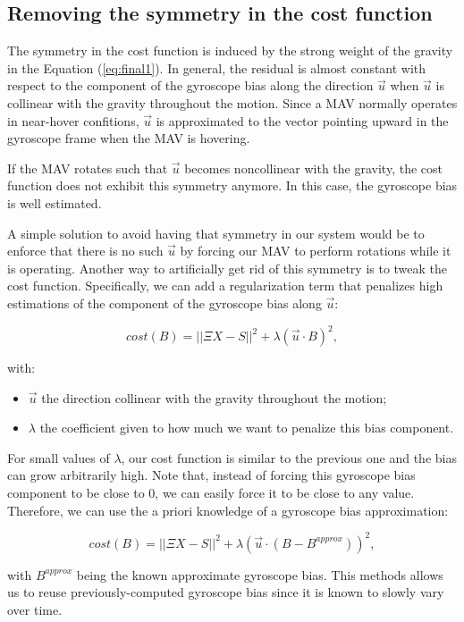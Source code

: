\documentclass[letterpaper, 10 pt, conference]{ieeeconf}  %
\begin{document}
\subsection{Removing the symmetry in the cost function \label{sec:symmetry}}

The symmetry in the cost function is induced by the strong weight of the gravity in the Equation (\ref{eq:final1}).
In general, the residual is almost constant with respect to the component of the gyroscope bias along the direction $\vec{u}$ when $\vec{u}$ is collinear with the gravity throughout the motion.
Since a MAV normally operates in near-hover confitions, $\vec{u}$ is approximated to the vector pointing upward in the gyroscope frame when the MAV is hovering.

If the MAV rotates such that $\vec{u}$ becomes noncollinear with the gravity, the cost function does not exhibit this symmetry anymore.
In this case, the gyroscope bias is well estimated.

A simple solution to avoid having that symmetry in our system would be to enforce that there is no such $\vec{u}$ by forcing our MAV to perform rotations while it is operating.
Another way to artificially get rid of this symmetry is to tweak the cost function.
Specifically, we can add a regularization term that penalizes high estimations of the component of the gyroscope bias along $\vec{u}$:

\begin{equation}
cost(B) = ||\Xi X - S||^2 + \lambda (\vec{u} \cdot B)^2,
\end{equation}

\noindent with:
\begin{itemize}
\item $\vec{u}$ the direction collinear with the gravity throughout the motion;
\item $\lambda$ the coefficient given to how much we want to penalize this bias component.
\end{itemize}

For small values of $\lambda$, our cost function is similar to the previous one and the bias can grow arbitrarily high.
Note that, instead of forcing this gyroscope bias component to be close to $0$, we can easily force it to be close to any value.
Therefore, we can use the a priori knowledge of a gyroscope bias approximation:

\[
cost(B) = ||\Xi X - S||^2 +  \lambda (\vec{u} \cdot (B - B^{approx} ))^2,
\]

\noindent with $B^{approx}$ being the known approximate gyroscope bias.
This methods allows us to reuse previously-computed gyroscope bias since it is known to slowly vary over time.
\end{document}
